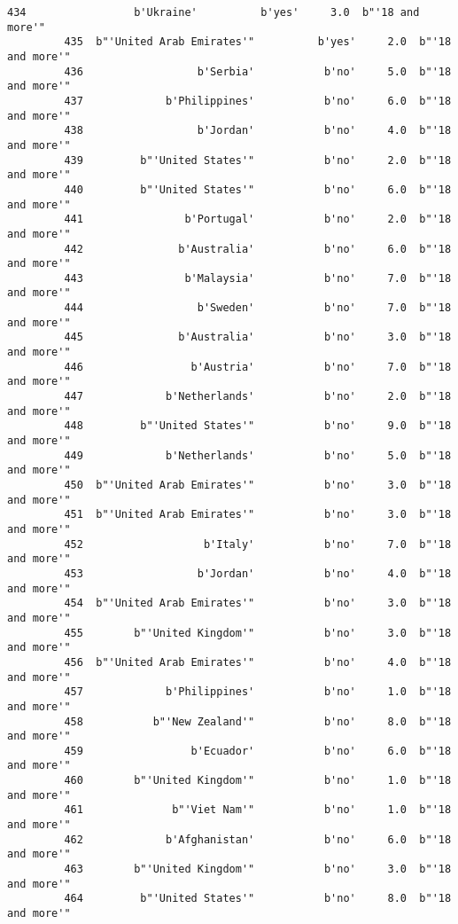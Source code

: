 \documentclass[11pt]{article}
\begin{document}
\begin{Verbatim}[commandchars=\\\{\}]
         434                 b'Ukraine'          b'yes'     3.0  b"'18 and more'"   
         435  b"'United Arab Emirates'"          b'yes'     2.0  b"'18 and more'"   
         436                  b'Serbia'           b'no'     5.0  b"'18 and more'"   
         437             b'Philippines'           b'no'     6.0  b"'18 and more'"   
         438                  b'Jordan'           b'no'     4.0  b"'18 and more'"   
         439         b"'United States'"           b'no'     2.0  b"'18 and more'"   
         440         b"'United States'"           b'no'     6.0  b"'18 and more'"   
         441                b'Portugal'           b'no'     2.0  b"'18 and more'"   
         442               b'Australia'           b'no'     6.0  b"'18 and more'"   
         443                b'Malaysia'           b'no'     7.0  b"'18 and more'"   
         444                  b'Sweden'           b'no'     7.0  b"'18 and more'"   
         445               b'Australia'           b'no'     3.0  b"'18 and more'"   
         446                 b'Austria'           b'no'     7.0  b"'18 and more'"   
         447             b'Netherlands'           b'no'     2.0  b"'18 and more'"   
         448         b"'United States'"           b'no'     9.0  b"'18 and more'"   
         449             b'Netherlands'           b'no'     5.0  b"'18 and more'"   
         450  b"'United Arab Emirates'"           b'no'     3.0  b"'18 and more'"   
         451  b"'United Arab Emirates'"           b'no'     3.0  b"'18 and more'"   
         452                   b'Italy'           b'no'     7.0  b"'18 and more'"   
         453                  b'Jordan'           b'no'     4.0  b"'18 and more'"   
         454  b"'United Arab Emirates'"           b'no'     3.0  b"'18 and more'"   
         455        b"'United Kingdom'"           b'no'     3.0  b"'18 and more'"   
         456  b"'United Arab Emirates'"           b'no'     4.0  b"'18 and more'"   
         457             b'Philippines'           b'no'     1.0  b"'18 and more'"   
         458           b"'New Zealand'"           b'no'     8.0  b"'18 and more'"   
         459                 b'Ecuador'           b'no'     6.0  b"'18 and more'"   
         460        b"'United Kingdom'"           b'no'     1.0  b"'18 and more'"   
         461              b"'Viet Nam'"           b'no'     1.0  b"'18 and more'"   
         462             b'Afghanistan'           b'no'     6.0  b"'18 and more'"   
         463        b"'United Kingdom'"           b'no'     3.0  b"'18 and more'"   
         464         b"'United States'"           b'no'     8.0  b"'18 and more'"   

\end{Verbatim}
\end{document}
